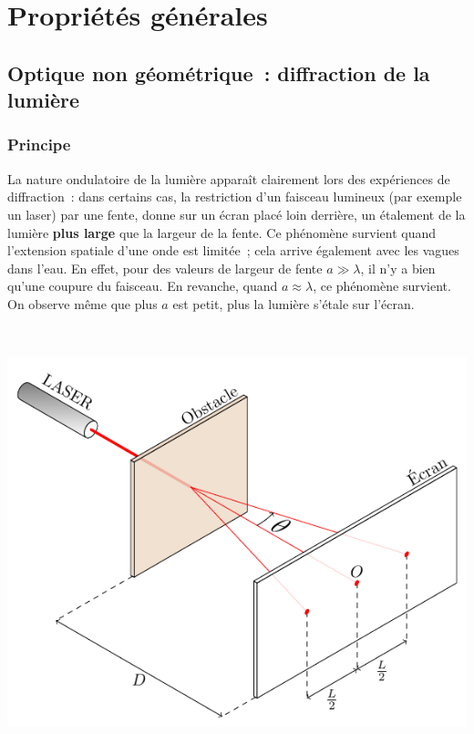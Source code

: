 \documentclass[../../main/main.tex]{subfiles}
\begin{document}
\newpage

\section{Propriétés générales}
\subsection{Optique non géométrique~: diffraction de la lumière}
\label{ssec:optdiff}
\subsubsection{Principe}

\noindent
\begin{minipage}[t]{.48\linewidth}
	La nature ondulatoire de la lumière apparaît clairement lors des expériences de
	diffraction~: dans certains cas, la restriction d'un faisceau lumineux (par
	exemple un laser) par une fente, donne sur un écran placé loin derrière, un
	étalement de la lumière \textbf{plus large} que la largeur de la fente.
	\smallbreak
	Ce phénomène survient quand l'extension spatiale d'une onde est limitée~; cela
	arrive également avec les vagues dans l'eau. En effet, pour des valeurs de
	largeur de fente $a \gg \lambda$, il n'y a bien qu'une coupure du faisceau. En
	revanche, quand $a \approx \lambda$, ce phénomène survient. On observe même que
	plus $a$ est petit, plus la lumière s'étale sur l'écran.
\end{minipage}
\hfill
\begin{minipage}[t]{.48\linewidth}
	~
	\vspace*{-30pt}
	\begin{center}
		\includegraphics[width=.8\linewidth]{diffraction}
		\label{fig:diff_las}
	\end{center}
\end{minipage}
\end{document}
